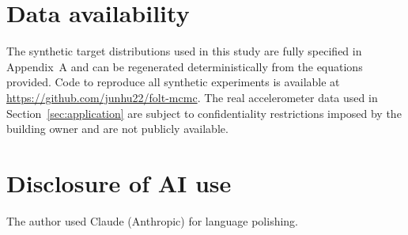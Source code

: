 \section*{Data availability}
The synthetic target distributions used in this study are fully
specified in Appendix~A and can be regenerated deterministically
from the equations provided. Code to reproduce all synthetic
experiments is available at
\url{https://github.com/junhu22/folt-mcmc}. The real
accelerometer data used in Section~\ref{sec:application} are
subject to confidentiality restrictions imposed by the building
owner and are not publicly available.

\section*{Disclosure of AI use}
The author used Claude (Anthropic) for language polishing.
